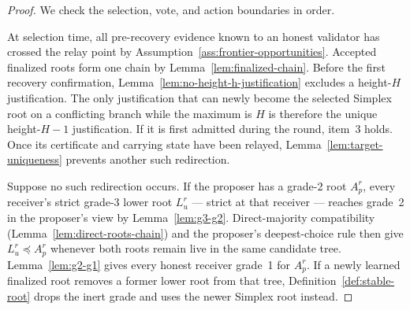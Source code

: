 \begin{proof}
We check the selection, vote, and action boundaries in order.

At selection time, all pre-recovery evidence known to an honest validator has
crossed the relay point by
Assumption~\ref{ass:frontier-opportunities}.  Accepted finalized roots form
one chain by Lemma~\ref{lem:finalized-chain}.  Before the first recovery
confirmation, Lemma~\ref{lem:no-height-h-justification} excludes a height-\(H\)
justification.  The only justification that can newly become the selected
Simplex root on a conflicting branch while the maximum is \(H\) is therefore
the unique height-\(H-1\) justification.  If it is first admitted during the
round, item~3 holds.  Once its certificate and carrying state have been
relayed, Lemma~\ref{lem:target-uniqueness} prevents another such redirection.

Suppose no such redirection occurs.  If the proposer has a grade-2 root
\(A_p^r\), every receiver's strict grade-3 lower root \(L_u^r\) ---
strict at that receiver --- reaches grade~2 in the
proposer's view by Lemma~\ref{lem:g3-g2}.  Direct-majority compatibility
(Lemma~\ref{lem:direct-roots-chain}) and the proposer's deepest-choice rule
then give \(L_u^r\preceq A_p^r\) whenever both roots remain live in the same
candidate tree.  Lemma~\ref{lem:g2-g1} gives every honest receiver grade~1
for \(A_p^r\).  If a newly learned finalized root removes a former lower root
from that tree, Definition~\ref{def:stable-root} drops the inert grade and
uses the newer Simplex root instead.


\end{proof}
